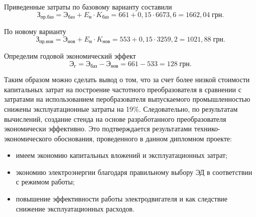         Приведенные затраты по базовому варианту составили
        \begin{equation*}
            \text{З}_\text{пр.баз} = 
                \text{Э}_\text{баз} + E_\text{н} \cdot K_\text{баз} = 
                    661 + 0,15 \cdot 6673,6 = 1662,04 \; \text{грн}.
        \end{equation*}

        По новому варианту
        \begin{equation*}
            \text{З}_\text{пр.нов} = 
                \text{Э}_\text{нов} + E_\text{н} \cdot K_\text{нов} = 
                    553 + 0,15 \cdot 3259,2 = 1021,88 \; \text{грн}.
        \end{equation*}

        Определим годовой экономический эффект
        \begin{equation*}
            \text{Э}_\text{г} = \text{Э}_\text{баз} 
                - \text{Э}_\text{нов} = 661 - 533 = 128 \; \text{грн}.
        \end{equation*}



        Таким образом можно сделать вывод о том, что за счет более низкой
        стоимости капитальных затрат на построение частотного преобразователя в
        сравнении с затратами на использованием перобразователя выпускаемого
        промышленностью снижены эксплуатационные затраты на 19\%.
        Следовательно, по результатам вычислений, создание стенда на основе
        разработанного преобразователя экономически эффективно. Это
        подтверждается результатами технико-экономического обоснования,
        проведенного в данном дипломном проекте:
        \begin{itemize}
            \item имеем экономию капитальных вложений и эксплуатационных
                затрат;
            \item экономию электроэнергии благодаря правильному выбору ЭД в
                соответствии с режимом работы;
            \item повышение эффективности работы электродвигателя и как
                следствие снижение эксплуатационных расходов.
        \end{itemize}

